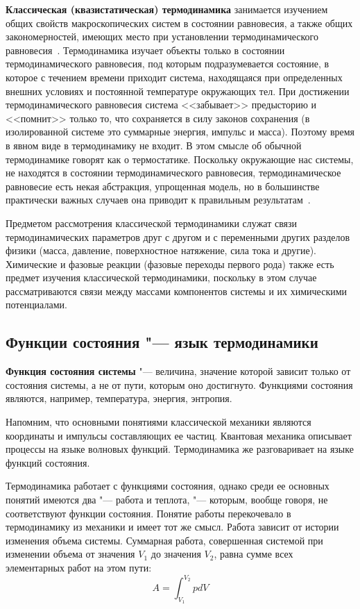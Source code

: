 \documentclass[12pt,a4paper,oneside]{book}
\begin{document}
\textbf{Классическая (квазистатическая) термодинамика} занимается изучением общих свойств макроскопических систем в состоянии равновесия, а также общих закономерностей, имеющих место при установлении термодинамического равновесия~\cite{Osipov1999a}. Термодинамика изучает объекты только в состоянии термодинамического равновесия, под которым подразумевается состояние, в которое с течением времени приходит система, находящаяся при определенных внешних условиях и постоянной температуре окружающих тел. При достижении термодинамического равновесия система <<забывает>> предысторию и <<помнит>> только то, что сохраняется в силу законов сохранения (в изолированной системе это суммарные энергия, импульс и масса). Поэтому время в явном виде в термодинамику не входит. В этом смысле об обычной термодинамике говорят как о термостатике. Поскольку окружающие нас системы, не находятся в состоянии термодинамического равновесия, термодинамическое равновесие есть некая абстракция, упрощенная модель, но в большинстве практически важных случаев она приводит к правильным результатам~\cite{Osipov1999a}.

Предметом рассмотрения классической термодинамики служат связи термодинамических параметров друг с другом и с переменными других разделов физики (масса, давление, поверхностное натяжение, сила тока и другие). Химические и фазовые реакции (фазовые переходы первого рода) также есть предмет изучения классической термодинамики, поскольку в этом случае рассматриваются связи между массами компонентов системы и их химическими потенциалами.


\subsection{Функции состояния "--- язык термодинамики}

{\bf Функция состояния системы} "--- величина, значение которой зависит только от состояния системы, а не от пути, которым оно достигнуто. Функциями состояния являются, например, температура, энергия, энтропия.

Напомним, что основными понятиями классической механики являются координаты
и импульсы составляющих ее частиц. Квантовая механика описывает процессы на языке волновых функций. Термодинамика же разговаривает на языке функций состояния.


Термодинамика работает с функциями состояния, однако среди ее основных понятий имеются два "--- работа и теплота, "--- которым, вообще говоря, не соответствуют функции состояния. Понятие работы перекочевало в термодинамику из механики и имеет тот же смысл. Работа зависит от истории изменения объема системы. Суммарная работа, совершенная системой при изменении объема от значения $V_1$ до значения $V_2$, равна сумме всех элементарных работ на этом пути:
\begin{equation}
	A = \int_{V_1}^{V_2} p dV
\end{equation}
\end{document}
